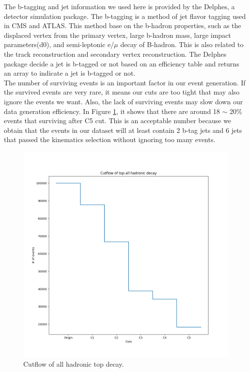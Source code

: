 The b-tagging and jet information we used here is provided by the Delphes, a detector simulation package.\cite{deFavereau:2013fsa} The b-tagging is a method of jet flavor tagging used in CMS and ATLAS.\cite{ATLAS:2016gsw}\cite{Sirunyan:2017ezt} This method base on the b-hadron properties, such as the displaced vertex from the primary vertex, large b-hadron mass, large impact parameters(d0), and semi-leptonic e/$\mu$ decay of B-hadron. This is also related to the track reconstruction and secondary vertex reconstruction. The Delphes package decide a jet is b-tagged or not based on an efficiency table and returns an array to indicate a jet is b-tagged or not.
\\
The number of surviving events is an important factor in our event generation. If the survived events are very rare, it means our cuts are too tight that may also ignore the events we want. Also, the lack of surviving events may slow down our data generation efficiency. In Figure \ref{fig:cutflow}, it shows that there are around 18 $\sim$ 20\% events that surviving after C5 cut. This is an acceptable number because we obtain that the events in our dataset will at least contain 2 b-tag jets and 6 jets that passed the kinematics selection without ignoring too many events.
\\
\begin{figure}[H]
	\includegraphics[width=0.9\linewidth]{Figures/ttbar_cutflow.png}
	\caption{Cutflow of all hadronic top decay.}
	\label{fig:cutflow}
\end{figure}
